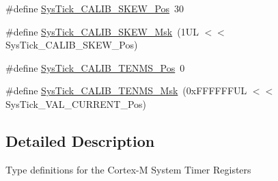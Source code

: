 \begin{DoxyCompactItemize}
\item 
\#define \hyperlink{group___c_m_s_i_s___sys_tick_gadd0c9cd6641b9f6a0c618e7982954860}{Sys\-Tick\-\_\-\-C\-A\-L\-I\-B\-\_\-\-S\-K\-E\-W\-\_\-\-Pos}~30
\item 
\#define \hyperlink{group___c_m_s_i_s___sys_tick_ga8a6a85a87334776f33d77fd147587431}{Sys\-Tick\-\_\-\-C\-A\-L\-I\-B\-\_\-\-S\-K\-E\-W\-\_\-\-Msk}~(1\-U\-L $<$$<$ Sys\-Tick\-\_\-\-C\-A\-L\-I\-B\-\_\-\-S\-K\-E\-W\-\_\-\-Pos)
\item 
\#define \hyperlink{group___c_m_s_i_s___sys_tick_gacae558f6e75a0bed5d826f606d8e695e}{Sys\-Tick\-\_\-\-C\-A\-L\-I\-B\-\_\-\-T\-E\-N\-M\-S\-\_\-\-Pos}~0
\item 
\#define \hyperlink{group___c_m_s_i_s___sys_tick_gaf1e68865c5aece2ad58971225bd3e95e}{Sys\-Tick\-\_\-\-C\-A\-L\-I\-B\-\_\-\-T\-E\-N\-M\-S\-\_\-\-Msk}~(0x\-F\-F\-F\-F\-F\-F\-U\-L $<$$<$ Sys\-Tick\-\_\-\-V\-A\-L\-\_\-\-C\-U\-R\-R\-E\-N\-T\-\_\-\-Pos)
\end{DoxyCompactItemize}


\subsection{Detailed Description}
Type definitions for the Cortex-\/\-M System Timer Registers 

